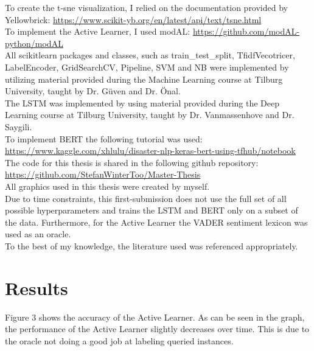 \documentclass[11pt, a4paper]{article}
\begin{document}
\noindent To create the t-sne visualization, I relied on the documentation provided by Yellowbrick: \url{https://www.scikit-yb.org/en/latest/api/text/tsne.html}\\

\noindent To implement the Active Learner, I used modAL: \url{https://github.com/modAL-python/modAL}\\

\noindent All scikit\-learn packages and classes, such as train\_test\_split, TfidfVecotricer, LabelEncoder, GridSearchCV, 
Pipeline, SVM and NB were implemented by utilizing material provided during the Machine Learning course at Tilburg University, taught by Dr. Güven and Dr. Önal.\\

\noindent The LSTM was implemented by using material provided during the Deep Learning course at Tilburg University, taught by Dr. Vanmassenhove and Dr. Saygili.\\

\noindent To implement BERT the following tutorial was used: \url{https://www.kaggle.com/xhlulu/disaster-nlp-keras-bert-using-tfhub/notebook}\\


\noindent The code for this thesis is shared in the following github repository: \url{https://github.com/StefanWinterToo/Master-Thesis}\\

\noindent All graphics used in this thesis were created by myself.\\

\noindent Due to time constraints, this first-submission does not use the full set of all possible hyperparameters and trains the LSTM and BERT only on a subset of the data.
Furthermore, for the Active Learner the VADER sentiment lexicon was used as an oracle.\\

\noindent To the best of my knowledge, the literature used was referenced appropriately.



\section{Results}

Figure 3 shows the accuracy of the Active Learner. As can be seen in the graph, the performance of the Active Learner slightly decreases over time. This is due to the oracle not doing a good
job at labeling queried instances.
\end{document}
